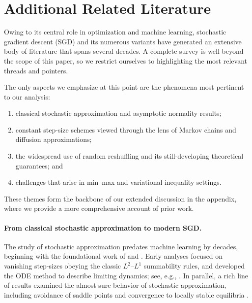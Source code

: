 \section{Additional Related Literature}
\label{app:additional_related}
Owing to its central role in optimization and machine learning, stochastic gradient descent (SGD) and its numerous variants have generated an extensive body of literature that spans several decades.  
A complete survey is well beyond the scope of this paper, so we restrict ourselves to highlighting the most relevant threads and pointers.  

The only aspects we emphasize at this point are the phenomena most pertinent to our analysis: 
\begin{enumerate} 
\item classical stochastic approximation and asymptotic normality results;  
\item constant step-size schemes viewed through the lens of Markov chains and diffusion approximations;  
\item the widespread use of random reshuffling and its still-developing theoretical guarantees; and  
\item challenges that arise in min–max and variational inequality settings.  
\end{enumerate}
These themes form the backbone of our extended discussion in the appendix, where we provide a more comprehensive account of prior work.

\paragraph{From classical stochastic approximation to modern SGD.}
The study of stochastic approximation predates machine learning by decades, beginning with the foundational work of \citet{robbins1951stochastic} and \citet{kiefer1952stochastic}. Early analyses focused on vanishing step-sizes obeying the classic $L^2$--$L^1$ summability rules, and developed the ODE method to describe limiting dynamics; see, e.g., \citet{ljung1978strong,ljung2003analysis,benaim2006dynamics,bertsekas2000gradient}. In parallel, a rich line of results examined the almost-sure behavior of stochastic approximation, including avoidance of saddle points and convergence to locally stable equilibria \citep{pemantle1990nonconvergence,brandiere1996algorithmes,benaim1995dynamics,hsieh2021limits,hsieh2023riemannian,jordan1998variational,mertikopoulos2020almost,mertikopoulos2024unified,staib2019escaping,antonakopoulos2022adagrad}. 


